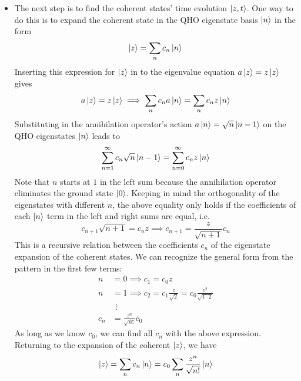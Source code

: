 \documentclass[11pt, a4paper]{article}
\begin{document}
\begin{itemize}
	\item The next step is to find the coherent states' time evolution $ \ket{z, t} $. One way to do this is to expand the coherent state in the QHO eigenstate basis $ \ket{n} $ in the form
	\begin{equation*}
		\ket{z} = \sum_{n} c_{n} \ket{n}
	\end{equation*}
	Inserting this expression for $ \ket{z} $ in to the eigenvalue equation $ a \ket{z} = z \ket{z} $ gives
	\begin{equation*}
		a \ket{z} = z \ket{z} \implies  \sum_{n} c_{n} a \ket{n} = \sum_{n} c_{n} z \ket{n}
	\end{equation*}
	Substituting in the annihilation operator's action  $ a \ket{n} = \sqrt{n}\ket{n-1} $ on the QHO eigenstates $ \ket{n} $ leads to
	\begin{equation*}
		 \sum_{n=1}^{\infty} c_{n} \sqrt{n} \ket{n - 1} =  \sum_{n=0}^{\infty} c_{n} z \ket{n}
	\end{equation*}
	Note that $ n $ starts at $ 1 $ in the left sum because the annihilation operator eliminates the ground state $ \ket{0} $. Keeping in mind the orthogonality of the eigenstates with different $ n $, the above equality only holds if the coefficients of each $ \ket{n} $ term in the left and right sums are equal, i.e.
	\begin{equation*}
		c_{n+1} \sqrt{n+1} = c_{n}z \implies c_{n+1} = \frac{z}{\sqrt{n+1}}c_{n}
	\end{equation*}
	This is a recursive relation between the coefficients $ c_{n} $ of the eigenstate expansion of the coherent states. We can recognize the general form from the pattern in the first few terms:
	\begin{align*}
		n &= 0 \implies c_{1} = c_{0}z\\
		n &= 1 \implies c_{2} = c_{1}\frac{z}{\sqrt{2}} = c_{0}\frac{z^{2}}{\sqrt{1 \cdot 2}}\\[-4mm]
		&{}\ \, \vdots\\[-4mm]
		c_{n} &= \frac{z^{n}}{\sqrt{n!}}c_{0}
	\end{align*}
	As long as we know $ c_{0} $, we can find all $ c_{n} $ with the above expression. Returning to the expansion of the coherent $ \ket{z} $, we have
	\begin{equation*}
		\ket{z} = \sum_{n}c_{n} \ket{n} = c_{0} \sum_{n} \frac{z^{n}}{\sqrt{n!}}\ket{n}
	\end{equation*}
	

\end{itemize}
\end{document}
